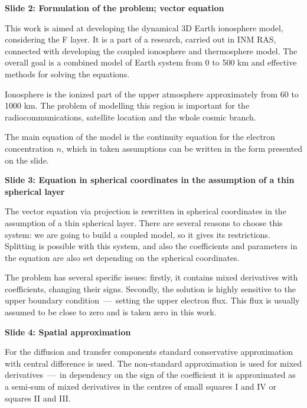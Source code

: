 \documentclass[2pt, a4paper, fleqn]{extarticle}
\begin{document}
{\bf Slide 2: Formulation of the problem; vector equation}

This work is aimed at developing the dynamical 3D Earth ionosphere model, considering the F layer. It is a part of a research, carried out in INM RAS, connected with developing the coupled ionosphere and thermosphere model. The overall goal is a combined model of Earth system from 0 to 500 km and effective methods for solving the equations.

Ionosphere is the ionized part of the upper atmosphere approximately from 60 to 1000 km. The problem of modelling this region is important for the radiocommunications, satellite location and the whole cosmic branch.

The main equation of the model is the continuity equation for the electron concentration $n$, which in taken assumptions can be written in the form presented on the slide.

\medskip

{\bf Slide 3: Equation in spherical coordinates in the assumption of a thin spherical layer}

The vector equation via projection is rewritten in spherical coordinates in the assumption of a thin spherical layer. There are several reasons to choose this system: we are going to build a coupled model, so it gives its restrictions. Splitting is possible with this system, and also the coefficients and parameters in the equation are also set depending on the spherical coordinates. %

The problem has several specific issues: firstly, it contains mixed derivatives with coefficients, changing their signs. Secondly, the solution is highly sensitive to the upper boundary condition~---~setting the upper electron flux. This flux is usually assumed to be close to zero and is taken zero in this work.

\medskip

{\bf Slide 4: Spatial approximation}

For the diffusion and transfer components standard conservative approximation with central difference is used. The non-standard approximation is used for mixed derivatives~---~in dependency on the sign of the coefficient it is approximated as a semi-sum of mixed derivatives in the centres of small squares I and IV or squares II and III.


\medskip
\end{document}
